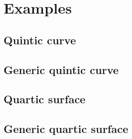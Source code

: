 \documentclass[a4paper,11pt]{article}
\numberwithin{equation}{section}
\theoremstyle{definition}
\begin{document}
\section{Examples}
\label{sec:Examples}

\subsection{Quintic curve}
\subsection{Generic quintic curve}
\subsection{Quartic surface}
\subsection{Generic quartic surface}




\end{document}
